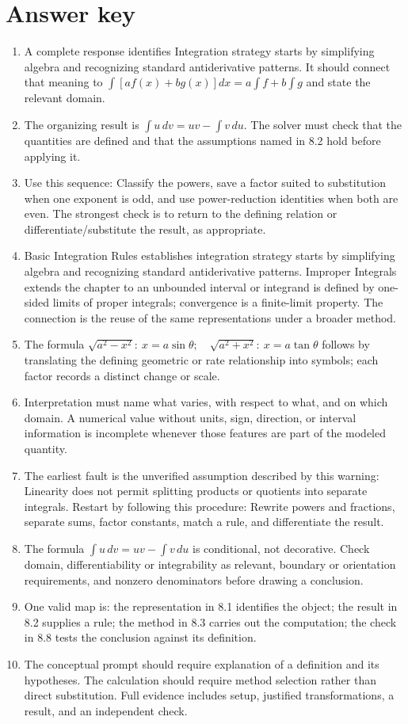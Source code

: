 \documentclass[11pt]{article}
\begin{document}
\section{Answer key}
\small
\begin{enumerate}
\item A complete response identifies Integration strategy starts by simplifying algebra and recognizing standard antiderivative patterns. It should connect that meaning to \(\int [af(x)+bg(x)]dx=a\int f+b\int g\) and state the relevant domain.
\item The organizing result is \(\int u\,dv=uv-\int v\,du\). The solver must check that the quantities are defined and that the assumptions named in 8.2 hold before applying it.
\item Use this sequence: Classify the powers, save a factor suited to substitution when one exponent is odd, and use power-reduction identities when both are even. The strongest check is to return to the defining relation or differentiate/substitute the result, as appropriate.
\item Basic Integration Rules establishes integration strategy starts by simplifying algebra and recognizing standard antiderivative patterns. Improper Integrals extends the chapter to an unbounded interval or integrand is defined by one-sided limits of proper integrals; convergence is a finite-limit property. The connection is the reuse of the same representations under a broader method.
\item The formula \(\sqrt{a^2-x^2}:\ x=a\sin\theta;\quad \sqrt{a^2+x^2}:\ x=a\tan\theta\) follows by translating the defining geometric or rate relationship into symbols; each factor records a distinct change or scale.
\item Interpretation must name what varies, with respect to what, and on which domain. A numerical value without units, sign, direction, or interval information is incomplete whenever those features are part of the modeled quantity.
\item The earliest fault is the unverified assumption described by this warning: Linearity does not permit splitting products or quotients into separate integrals. Restart by following this procedure: Rewrite powers and fractions, separate sums, factor constants, match a rule, and differentiate the result.
\item The formula \(\int u\,dv=uv-\int v\,du\) is conditional, not decorative. Check domain, differentiability or integrability as relevant, boundary or orientation requirements, and nonzero denominators before drawing a conclusion.
\item One valid map is: the representation in 8.1 identifies the object; the result in 8.2 supplies a rule; the method in 8.3 carries out the computation; the check in 8.8 tests the conclusion against its definition.
\item The conceptual prompt should require explanation of a definition and its hypotheses. The calculation should require method selection rather than direct substitution. Full evidence includes setup, justified transformations, a result, and an independent check.
\end{enumerate}
\normalsize
\end{document}

